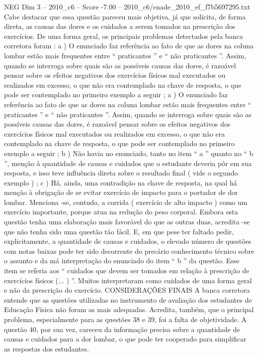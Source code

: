\begin{textsample}{NEG Dim 3 – 2010\_c6 – Score -7.00 – 2010\_c6/enade\_2010\_ef\_f7b5697295.txt}
Cabe destacar que essa questão pareceu mais objetiva, já que solicita, de forma direta, as causas das dores e os cuidados a serem tomados na prescrição dos exercícios.
De uma forma geral, os principais problemas detectados pela banca corretora foram : a ) O enunciado faz referência ao fato de que as dores na coluna lombar estão mais frequentes entre “ praticantes ” e “ não praticantes ”.
Assim, quando se interroga sobre quais são as possíveis causas das dores, é razoável pensar sobre os efeitos negativos dos exercícios físicos mal executados ou realizados em excesso, o que não era contemplado na chave de resposta, o que pode ser contemplado no primeiro exemplo a seguir ; a ) O enunciado faz referência ao fato de que as dores na coluna lombar estão mais frequentes entre “ praticantes ” e “ não praticantes ”.
Assim, quando se interroga sobre quais são as possíveis causas das dores, é razoável pensar sobre os efeitos negativos dos exercícios físicos mal executados ou realizados em excesso, o que não era contemplado na chave de resposta, o que pode ser contemplado no primeiro exemplo a seguir ; b ) Não havia no enunciado, tanto no item “ a ” quanto no “ b ”, menção à quantidade de causas e cuidados que o estudante deveria pôr em sua resposta, e isso teve influência direta sobre o resultado final ( vide o segundo exemplo ) ; c ) Há, ainda, uma contradição na chave de resposta, na qual há menção à obrigação de se evitar exercício de impacto para o portador de dor lombar.
Menciona -se, contudo, a corrida ( exercício de alto impacto ) como um exercício importante, porque atua na redução do peso corporal.
Embora esta questão tenha uma elaboração mais favorável do que as outras duas, acredita -se que não tenha sido uma questão tão fácil.
E, em que pese ter faltado pedir, explicitamente, a quantidade de causas e cuidados, o elevado número de questões com notas baixas pode ter sido decorrente do precário conhecimento técnico sobre o assunto e da má interpretação do enunciado do item “ b ” da questão.
Esse item se referia aos “ cuidados que devem ser tomados em relação à prescrição de exercícios físicos (... ) ”.
Muitos interpretaram como cuidados de uma forma geral e não da prescrição do exercício.
CONSIDERAÇÕES FINAIS A banca corretora entende que as questões utilizadas no instrumento de avaliação dos estudantes de Educação Física não foram as mais adequadas.
Acredita, também, que o principal problema, especialmente para as questões 38 e 39, foi a falta de objetividade.
A questão 40, por sua vez, careceu da informação precisa sobre a quantidade de causas e cuidados para a dor lombar, o que pode ter cooperado para simplificar as respostas dos estudantes.

\end{textsample}
